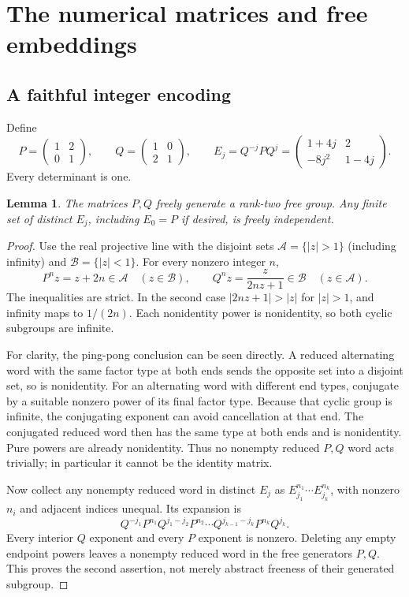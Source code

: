 \documentclass[11pt,letterpaper]{article}
\newtheorem{lemma}[theorem]{Lemma}
\theoremstyle{definition}
\theoremstyle{remark}
\newcommand{\smallmat}[4]{\begin{pmatrix}#1&#2\\#3&#4\end{pmatrix}}
\begin{document}
\section{The numerical matrices and free embeddings}
\label{gts:um:sec:matrices}
\subsection{A faithful integer encoding}
Define
\begin{equation}\label{gts:um:eq:Ej}
 P=\smallmat{1}{2}{0}{1},\qquad Q=\smallmat{1}{0}{2}{1},\qquad
 E_j=Q^{-j}PQ^j=\smallmat{1+4j}{2}{-8j^2}{1-4j}.
\end{equation}
Every determinant is one.

\begin{lemma}\label{gts:um:lem:free}
The matrices $P,Q$ freely generate a rank-two free group. Any finite set of distinct $E_j$, including $E_0=P$ if desired, is freely independent.
\end{lemma}
\begin{proof}
Use the real projective line with the disjoint sets $\mathcal A=\{|z|>1\}$ (including infinity) and $\mathcal B=\{|z|<1\}$. For every nonzero integer $n$,
\[
 P^nz=z+2n\in\mathcal A\quad(z\in\mathcal B),\qquad
 Q^nz=\frac{z}{2nz+1}\in\mathcal B\quad(z\in\mathcal A).
\]
The inequalities are strict. In the second case $|2nz+1|>|z|$ for $|z|>1$, and infinity maps to $1/(2n)$. Each nonidentity power is nonidentity, so both cyclic subgroups are infinite.

For clarity, the ping-pong conclusion can be seen directly. A reduced alternating word with the same factor type at both ends sends the opposite set into a disjoint set, so is nonidentity. For an alternating word with different end types, conjugate by a suitable nonzero power of its final factor type. Because that cyclic group is infinite, the conjugating exponent can avoid cancellation at that end. The conjugated reduced word then has the same type at both ends and is nonidentity. Pure powers are already nonidentity. Thus no nonempty reduced $P,Q$ word acts trivially; in particular it cannot be the identity matrix.

Now collect any nonempty reduced word in distinct $E_j$ as
$E_{j_1}^{n_1}\cdots E_{j_k}^{n_k}$, with nonzero $n_i$ and adjacent indices unequal. Its expansion is
\[
 Q^{-j_1}P^{n_1}Q^{j_1-j_2}P^{n_2}\cdots
 Q^{j_{k-1}-j_k}P^{n_k}Q^{j_k}.
\]
Every interior $Q$ exponent and every $P$ exponent is nonzero. Deleting any empty endpoint powers leaves a nonempty reduced word in the free generators $P,Q$. This proves the second assertion, not merely abstract freeness of their generated subgroup.
\end{proof}
\end{document}
